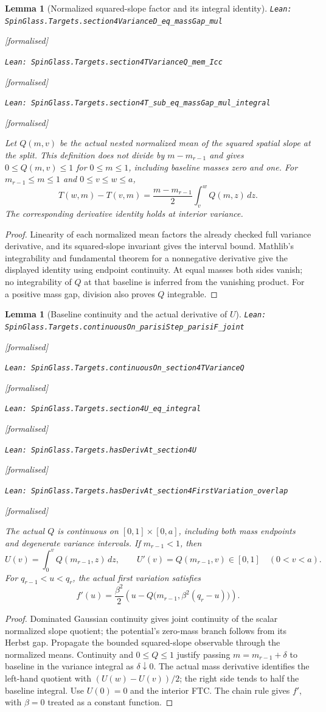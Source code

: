 \documentclass[11pt]{article}
\providecommand{\lean}[1]{\leavevmode\par\nopagebreak
  {\noindent\normalfont\footnotesize\raggedright\texttt{Lean: #1}\par}\nopagebreak}
\providecommand{\leanok}{\par\nopagebreak
  {\noindent\normalfont\footnotesize\textcolor{green!50!black}{[formalised]}\par}\nopagebreak}
\newtheorem{lemma}[theorem]{Lemma}
\begin{document}
\begin{lemma}[Normalized squared-slope factor and its integral identity]
\lean{SpinGlass.Targets.section4VarianceD\_eq\_massGap\_mul}\leanok
\lean{SpinGlass.Targets.section4TVarianceQ\_mem\_Icc}\leanok
\lean{SpinGlass.Targets.section4T\_sub\_eq\_massGap\_mul\_integral}\leanok
Let $Q(m,v)$ be the actual nested normalized mean of the squared spatial
slope at the split. This definition does not divide by $m-m_{r-1}$ and gives
$0\le Q(m,v)\le1$ for $0\le m\le1$, including baseline masses zero and one.
For $m_{r-1}\le m\le1$ and $0\le v\le w\le a$,
\[
 T(w,m)-T(v,m)=\frac{m-m_{r-1}}2\int_v^w Q(m,z)\,dz.
\]
The corresponding derivative identity holds at interior variance.
\end{lemma}
\begin{proof}
Linearity of each normalized mean factors the already checked full variance
derivative, and its squared-slope invariant gives the interval bound.
Mathlib's integrability and fundamental theorem for a nonnegative derivative
give the displayed identity using endpoint continuity. At equal masses both
sides vanish; no integrability of $Q$ at that baseline is inferred from the
vanishing product. For a positive mass gap, division also proves $Q$ integrable.
\end{proof}
\begin{lemma}[Baseline continuity and the actual derivative of $U$]
\lean{SpinGlass.Targets.continuousOn\_parisiStep\_parisiF\_joint}\leanok
\lean{SpinGlass.Targets.continuousOn\_section4TVarianceQ}\leanok
\lean{SpinGlass.Targets.section4U\_eq\_integral}\leanok
\lean{SpinGlass.Targets.hasDerivAt\_section4U}\leanok
\lean{SpinGlass.Targets.hasDerivAt\_section4FirstVariation\_overlap}\leanok
The actual $Q$ is continuous on $[0,1]\times[0,a]$, including both mass
endpoints and degenerate variance intervals. If $m_{r-1}<1$, then
\[
 U(v)=\int_0^v Q(m_{r-1},z)\,dz,\qquad
 U'(v)=Q(m_{r-1},v)\in[0,1]\quad(0<v<a).
\]
For $q_{r-1}<u<q_r$, the actual first variation satisfies
\[
 f'(u)=\frac{\beta^2}{2}
 \left(u-Q\bigl(m_{r-1},\beta^2(q_r-u)\bigr)\right).
\]
\end{lemma}
\begin{proof}
Dominated Gaussian continuity gives joint continuity of the scalar normalized
slope quotient; the potential's zero-mass branch follows from its Herbst gap.
Propagate the bounded squared-slope observable through the normalized means.
Continuity and $0\le Q\le1$ justify passing $m=m_{r-1}+\delta$ to baseline
in the variance integral as $\delta\downarrow0$. The actual mass derivative
identifies the left-hand quotient with $(U(w)-U(v))/2$; the right side tends
to half the baseline integral. Use $U(0)=0$ and the interior FTC. The chain
rule gives $f'$, with $\beta=0$ treated as a constant function.
\end{proof}
\end{document}
